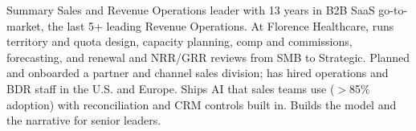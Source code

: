 \documentclass{resume}
\begin{document}
\vspace{-0.15cm}

\begin{rSection}{Summary}
Sales and Revenue Operations leader with 13 years in B2B SaaS go-to-market, the last 5+ leading Revenue Operations. At Florence Healthcare, runs territory and quota design, capacity planning, comp and commissions, forecasting, and renewal and NRR/GRR reviews from SMB to Strategic. Planned and onboarded a partner and channel sales division; has hired operations and BDR staff in the U.S. and Europe. Ships AI that sales teams use ($>$85\% adoption) with reconciliation and CRM controls built in. Builds the model and the narrative for senior leaders.
\end{rSection}
\vspace{-0.15cm}
\end{document}
